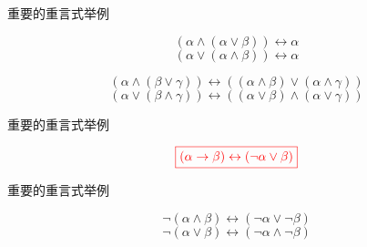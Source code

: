 \begin{frame}{}
  \begin{exampleblock}{重要的重言式举例}
    \begin{description}[<+->][分配律:]
      \item[吸收律:]
        \[
          (\alpha \land (\alpha \lor \beta)) \leftrightarrow \alpha
        \]
        \[
          (\alpha \lor (\alpha \land \beta)) \leftrightarrow \alpha
        \]
      \item[分配律:]
        \[
          (\alpha \land (\beta \lor \gamma)) \leftrightarrow ((\alpha \land \beta) \lor (\alpha \land \gamma))
        \]
        \[
          (\alpha \lor (\beta \land \gamma)) \leftrightarrow ((\alpha \lor \beta) \land (\alpha \lor \gamma))
        \]
    \end{description}
  \end{exampleblock}
\end{frame}

\begin{frame}{}
  \begin{exampleblock}{重要的重言式举例}
    \begin{description}[<+->][条件重言式:]
      \item[条件重言式:]
        \[
          \textcolor{red}{\boxed{(\alpha \to \beta) \leftrightarrow (\lnot \alpha \lor \beta)}}
        \]
    \end{description}
  \end{exampleblock}
\end{frame}

\begin{frame}{}
  \begin{exampleblock}{重要的重言式举例}
    \begin{description}
      \item[德摩根 (De Morgan) 律:]
        \[
          \lnot (\alpha \land \beta) \leftrightarrow (\lnot \alpha \lor \lnot \beta)
        \]
        \[
          \lnot (\alpha \lor \beta) \leftrightarrow (\lnot \alpha \land \lnot \beta)
        \]
    \end{description}
  \end{exampleblock}
\end{frame}

